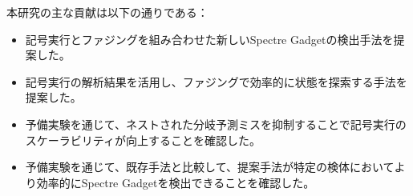 本研究の主な貢献は以下の通りである：

\begin{itemize} 
  \item 記号実行とファジングを組み合わせた新しいSpectre Gadgetの検出手法を提案した。 
  \item 記号実行の解析結果を活用し、ファジングで効率的に状態を探索する手法を提案した。 
  \item 予備実験を通じて、ネストされた分岐予測ミスを抑制することで記号実行のスケーラビリティが向上することを確認した。 
  \item 予備実験を通じて、既存手法と比較して、提案手法が特定の検体においてより効率的にSpectre Gadgetを検出できることを確認した。 
\end{itemize}
